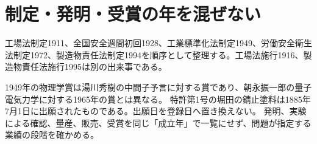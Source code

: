 \section{制定・発明・受賞の年を混ぜない}
\label{theory:env:safetyhistory}
\label{theory:env:nobeljapan}
工場法制定1911、全国安全週間初回1928、工業標準化法制定1949、労働安全衛生法制定1972、製造物責任法制定1994を順序として整理する。工場法施行1916、製造物責任法施行1995は別の出来事である。\cite{env60_safety}

1949年の物理学賞は湯川秀樹の中間子予言に対する賞であり、朝永振一郎の量子電気力学に対する1965年の賞とは異なる。\cite{env60_yukawa}
特許第1号の堀田の錆止塗料は1885年7月1日に出願されたものである。出願日を登録日へ置き換えない。\cite{env60_patent}
発明、実験による確認、量産、販売、受賞を同じ「成立年」で一覧にせず、問題が指定する業績の段階を確かめる。
